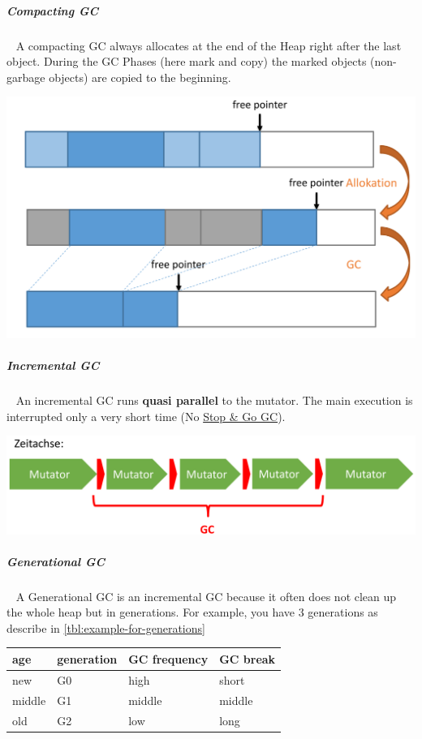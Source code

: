\documentclass[11pt,twoside,landscape]{article}
\begin{document}
\begin{multicols}{3}
\subparagraph{Compacting GC} \
\label{sec:org8c4caa8}
A compacting GC always allocates at the end of the Heap right after the last object.
During the GC Phases (here mark and copy) the marked objects (non-garbage objects) are copied to the beginning.


{
\begin{center}
\includegraphics[width=.9\linewidth]{img/compacting_gc.png}
\end{center}
\label{fig:compacting-gc-example}
}
\subparagraph{Incremental GC} \
\label{sec:org02d9328}
An incremental GC runs \textbf{quasi parallel} to the mutator.
The main execution is interrupted only a very short time (No \href{../../../roam/20221230204307-when_is_the_garbage_collector_executed.org}{Stop \& Go GC}).


{
\begin{center}
\includegraphics[width=.9\linewidth]{img/incremental_gc.png}
\end{center}
\captionof{figure}{Incremental GC}\label{fig:incremental-gc}
}

\subparagraph{Generational GC} \
\label{sec:org00a2c39}
A Generational GC is an incremental GC because it often does not clean up the whole heap but in generations.
For example, you have 3 generations as describe in \autoref{tbl:example-for-generations}

{
\begin{center}
\begin{tabular}{llll}
age & generation & GC frequency & GC break\\[0pt]
\hline
new & G0 & high & short\\[0pt]
middle & G1 & middle & middle\\[0pt]
old & G2 & low & long\\[0pt]
\end{tabular}
\end{center}
\label{tbl:example-for-generations}
}


\end{multicols}
\end{document}
